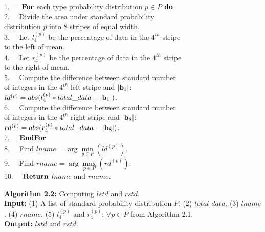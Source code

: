 \documentclass[lettersize,journal]{IEEEtran}
\begin{document}
\begin{tabbing}

1.~~ \= ${\bf For}$ \= each type probability distribution $p \in P$ ${\bf do}$ \\
2.~~ \>             \> Divide the area under standard probability \\
     \>             \> distribution $p$ into 8 stripes of equal width. \\
3.~~ \>             \> Let $l^{(p)}_{4}$ be the percentage of data in the $4^{th}$ stripe \\
     \>             \> to the left of mean. \\
4.~~ \>             \> Let $r^{(p)}_{4}$ be the percentage of data in the $4^{th}$ stripe \\
     \>             \> to the right of mean.\\
5.~~ \>             \> Compute the difference between standard number \\
     \>             \> of integers in the $4^{th}$ left stripe and $|{\bf b}_{1}|$: \\
     \>             \> $ld^{(p)} = abs(l^{(p)}_{4} * total\_data - |{\bf b}_{1}|)$. \\
6.~~ \>             \> Compute the difference between standard number \\
     \>             \> of integers in the $4^{th}$ right stripe and $|{\bf b}_{8}|$: \\
     \>             \> $rd^{(p)} = abs(r^{(p)}_{4} * total\_data - |{\bf b}_{8}|)$. \\
7.~~ \> ${\bf EndFor}$ \\
8.~~ \> Find $lname = \arg \min\limits_{p \in P} (ld^{(p)})$. \\
9.~~ \> Find $rname = \arg \max\limits_{p \in P} (rd^{(p)})$. \\
10.~~\> ${\bf Return}$ $lname$ and $rname$.
\end{tabbing}

\vspace{0.2in}
\noindent
{\bf Algorithm 2.2:} Computing $lstd$ and $rstd$. \\

\noindent
{\bf Input:} (1) A list of standard probability distribution $P$. (2) $total\_data$. (3) $lname$.
(4) $rname$. (5) $l^{(p)}_{4}$ and $r^{(p)}_{4}$; $\forall p \in P$ from Algorithm 2.1. \\
{\bf Output:} $lstd$ and $rstd$.
\end{document}
